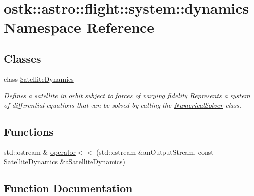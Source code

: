 \hypertarget{namespaceostk_1_1astro_1_1flight_1_1system_1_1dynamics}{}\section{ostk\+:\+:astro\+:\+:flight\+:\+:system\+:\+:dynamics Namespace Reference}
\label{namespaceostk_1_1astro_1_1flight_1_1system_1_1dynamics}
\subsection*{Classes}
\begin{DoxyCompactItemize}
\item 
class \hyperlink{classostk_1_1astro_1_1flight_1_1system_1_1dynamics_1_1_satellite_dynamics}{Satellite\+Dynamics}
\begin{DoxyCompactList}\small\item\em Defines a satellite in orbit subject to forces of varying fidelity Represents a system of differential equations that can be solved by calling the \hyperlink{classostk_1_1astro_1_1_numerical_solver}{Numerical\+Solver} class. \end{DoxyCompactList}\end{DoxyCompactItemize}
\subsection*{Functions}
\begin{DoxyCompactItemize}
\item 
std\+::ostream \& \hyperlink{namespaceostk_1_1astro_1_1flight_1_1system_1_1dynamics_a6f5490ccec4bf39bd4de23b8c86101f0}{operator$<$$<$} (std\+::ostream \&an\+Output\+Stream, const \hyperlink{classostk_1_1astro_1_1flight_1_1system_1_1dynamics_1_1_satellite_dynamics}{Satellite\+Dynamics} \&a\+Satellite\+Dynamics)
\end{DoxyCompactItemize}


\subsection{Function Documentation}
\mbox{\label{namespaceostk_1_1astro_1_1flight_1_1system_1_1dynamics_a6f5490ccec4bf39bd4de23b8c86101f0}} 
